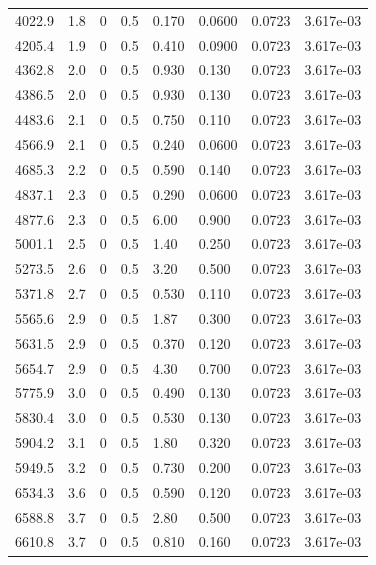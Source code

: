 \documentclass[preview]{standalone}
\begin{document}
{{{\begin{tabular}{L{1.2cm}C{1.2cm} C{0.3cm}C{0.5cm} C{1.4cm}C{1.4cm} C{1.4cm}C{1.4cm}}
  4022.9  &   1.8  & 0     & 0.5 &  0.170  & 0.0600  & 0.0723 &  3.617e-03   \\ 
  4205.4  &   1.9  & 0     & 0.5 &  0.410  & 0.0900  & 0.0723 &  3.617e-03   \\ 
  4362.8  &   2.0  & 0     & 0.5 &  0.930  & 0.130  & 0.0723 &  3.617e-03   \\ 
  4386.5  &   2.0  & 0     & 0.5 &  0.930  & 0.130  & 0.0723 &  3.617e-03   \\ 
  4483.6  &   2.1  & 0     & 0.5 &  0.750  & 0.110  & 0.0723 &  3.617e-03   \\ 
  4566.9  &   2.1  & 0     & 0.5 &  0.240  & 0.0600  & 0.0723 &  3.617e-03   \\ 
  4685.3  &   2.2  & 0     & 0.5 &  0.590  & 0.140  & 0.0723 &  3.617e-03   \\ 
  4837.1  &   2.3  & 0     & 0.5 &  0.290  & 0.0600  & 0.0723 &  3.617e-03   \\ 
  4877.6  &   2.3  & 0     & 0.5 &  6.00  & 0.900  & 0.0723 &  3.617e-03   \\ 
  5001.1  &   2.5  & 0     & 0.5 &  1.40  & 0.250  & 0.0723 &  3.617e-03   \\ 
  5273.5  &   2.6  & 0     & 0.5 &  3.20  & 0.500  & 0.0723 &  3.617e-03   \\ 
  5371.8  &   2.7  & 0     & 0.5 &  0.530  & 0.110  & 0.0723 &  3.617e-03   \\ 
  5565.6  &   2.9  & 0     & 0.5 &  1.87  & 0.300  & 0.0723 &  3.617e-03   \\ 
  5631.5  &   2.9  & 0     & 0.5 &  0.370  & 0.120  & 0.0723 &  3.617e-03   \\ 
  5654.7  &   2.9  & 0     & 0.5 &  4.30  & 0.700  & 0.0723 &  3.617e-03   \\ 
  5775.9  &   3.0  & 0     & 0.5 &  0.490  & 0.130  & 0.0723 &  3.617e-03   \\ 
  5830.4  &   3.0  & 0     & 0.5 &  0.530  & 0.130  & 0.0723 &  3.617e-03   \\ 
  5904.2  &   3.1  & 0     & 0.5 &  1.80  & 0.320  & 0.0723 &  3.617e-03   \\ 
  5949.5  &   3.2  & 0     & 0.5 &  0.730  & 0.200  & 0.0723 &  3.617e-03   \\ 
  6534.3  &   3.6  & 0     & 0.5 &  0.590  & 0.120  & 0.0723 &  3.617e-03   \\ 
  6588.8  &   3.7  & 0     & 0.5 &  2.80  & 0.500  & 0.0723 &  3.617e-03   \\ 
  6610.8  &   3.7  & 0     & 0.5 &  0.810  & 0.160  & 0.0723 &  3.617e-03   \\ 

\end{tabular}}}}
\end{document}
